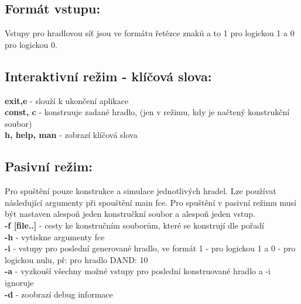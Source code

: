 \documentclass[12pt, oneside]{article}
\begin{document}
\subsection*{Formát vstupu:}
Vstupy pro hradlovou síť jsou ve formátu řetězce znaků a to 1 pro logickou 1 a  0 pro logickou 0.
\subsection*{Interaktivní režim - klíčová slova:} 
\textbf{exit,e} - slouží k ukončení aplikace \\
\textbf{const, c} - konstruuje zadané hradlo, (jen v režimu, kdy je načtený konstrukční soubor) \\
\textbf{h, help, man} - zobrazí klíčová slova \\
\subsection*{Pasivní režim:} 
Pro spuštění pouze konstrukce a simulace jednotlivých hradel. Lze používat následující argumenty při spouštění main fce.  Pro spuštění v pasivní režimu musí být nastaven alespoň jeden konstručkní soubor a alespoň jeden vstup.\\
\textbf{-f [file..] }- cesty ke konstručním souborům, které se konstrují dle pořadí \\
\textbf{-h} - vytiskne argumenty fce \\ 
\textbf{-i} - vstupy pro poslední generované hradlo, ve formát 1 - pro logickou 1 a 0 - pro logickou nulu, př: pro hradlo DAND: 10 \\
\textbf{-a} - vyzkouší všechny možné vstupy pro poslední konstruované hradlo a -i ignoruje\\
\textbf{-d} - zoobrazí debug informace\\
\end{document}
